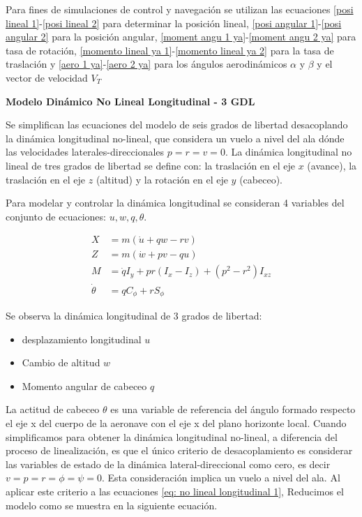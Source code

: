 Para fines de simulaciones de control y navegación se utilizan las ecuaciones \ref{posi lineal 1}-\ref{posi lineal 2} para determinar la posición lineal, \ref{posi angular 1}-\ref{posi angular 2} para la posición angular,  \ref{moment angu 1 ya}-\ref{moment angu 2 ya} para tasa de rotación, \ref{momento lineal ya 1}-\ref{momento lineal ya 2} para la tasa de traslación y \ref{aero 1 ya}-\ref{aero 2 ya} para los ángulos aerodinámicos $\alpha$ y $\beta$ y el vector de velocidad $V_T$
\bigskip

\textbf{Modelo Dinámico No Lineal Longitudinal - 3 GDL}

Se simplifican las ecuaciones del modelo de seis grados de libertad desacoplando la dinámica longitudinal no-lineal, que considera un vuelo a nivel del ala dónde las velocidades laterales-direccionales $p=r=v=0$.
La dinámica longitudinal no lineal de tres grados de libertad se define con: la traslación en el eje $x$ (avance), la traslación en el eje $z$ (altitud) y la rotación en el eje $y$ (cabeceo). 

Para modelar y controlar la dinámica longitudinal se consideran 4 variables del conjunto de ecuaciones: $u, w, q, \theta$. 

\begin{align} 
\label{eq: no lineal longitudinal 1}
X &= m (\dot u + qw - rv) \\
Z &= m (\dot w + pv - qu) \\
M &=  \dot q I_{y} + pr(I_{x} - I_{z}) + (p^2 - r^2) I_{xz} \\
\dot \theta &= q C_{\phi} + r S_{\phi}
\end{align}

Se observa la dinámica longitudinal de 3 grados de libertad:

\begin{itemize}
    \item desplazamiento longitudinal $u$
    \item Cambio de altitud $w$
    \item Momento angular de cabeceo $q$
\end{itemize}

La actitud de cabeceo $\theta$ es una variable de referencia del ángulo formado respecto el eje x del cuerpo de la aeronave con el eje x del plano horizonte local.
%
Cuando simplificamos para obtener la dinámica longitudinal no-lineal, a diferencia del proceso de linealización, es que el único criterio de desacoplamiento es considerar las variables de estado de la dinámica lateral-direccional como cero, es decir $v=p=r=\phi=\psi=0$. Esta consideración implica un vuelo a nivel del ala.  Al aplicar este criterio a las ecuaciones \ref{eq: no lineal longitudinal 1}, Reducimos el modelo como se muestra en la siguiente ecuación. 

